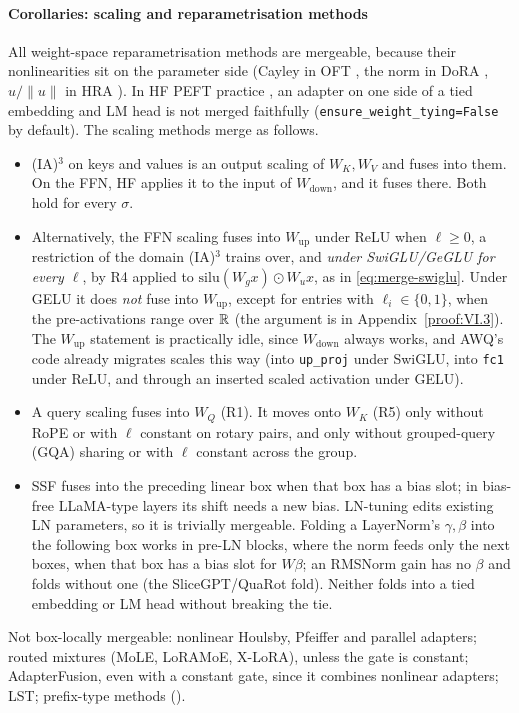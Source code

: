 \paragraph{Corollaries: scaling and reparametrisation methods}
All weight-space reparametrisation methods are mergeable, because their nonlinearities sit on the parameter side (Cayley
in OFT \citep{qiu2023controlling}, the norm in DoRA \citep{liu2024dora}, $u/\lVert u\rVert$ in HRA
\citep{yuan2024bridging}). In HF PEFT practice \citep{xmangrulkar2022peft}, an adapter on one side of a tied embedding
and LM head is not merged faithfully (\texttt{ensure\_weight\_tying=False} by default). The scaling methods merge as
follows.
\begin{itemize}
  \item (IA)$^3$ on keys and values is an output scaling of $W_K,W_V$ and fuses into them. On the FFN, HF applies it to
  the input of $W_{\mathrm{down}}$, and it fuses there. Both hold for every $\sigma$.
  \item Alternatively, the FFN scaling fuses into $W_{\mathrm{up}}$ under ReLU when $\ell\ge0$, a restriction of the
  domain (IA)$^3$ trains over, and \emph{under SwiGLU/GeGLU for every $\ell$}, by R4 applied to
  $\mathrm{silu}(W_gx)\odot W_ux$, as in \eqref{eq:merge-swiglu}. Under GELU it does \emph{not} fuse into
  $W_{\mathrm{up}}$, except for entries with $\ell_i\in\{0,1\}$, when the pre-activations range over $\mathbb{R}$ (the argument is
  in Appendix~\ref{proof:VI.3}). The $W_{\mathrm{up}}$ statement is practically idle, since $W_{\mathrm{down}}$ always
  works, and AWQ's code already migrates scales this way (into \texttt{up\_proj} under SwiGLU, into \texttt{fc1} under
  ReLU, and through an inserted scaled activation under GELU).
  \item A query scaling fuses into $W_Q$ (R1). It moves onto $W_K$ (R5) only without RoPE or with $\ell$ constant on
  rotary pairs, and only without grouped-query (GQA) sharing or with $\ell$ constant across the group.
  \item SSF fuses into the preceding linear box when that box has a bias slot; in bias-free LLaMA-type layers its shift
  needs a new bias. LN-tuning edits existing LN parameters, so it is trivially mergeable. Folding a LayerNorm's
  $\gamma,\beta$ into the following box works in pre-LN blocks, where the norm feeds only the next boxes, when that box
  has a bias slot for $W\beta$; an RMSNorm gain has no $\beta$ and folds without one (the SliceGPT/QuaRot fold). Neither
  folds into a tied embedding or LM head without breaking the tie.
\end{itemize}
Not box-locally mergeable: nonlinear Houlsby, Pfeiffer and parallel adapters; routed mixtures (MoLE, LoRAMoE, X-LoRA),
unless the gate is constant; AdapterFusion, even with a constant gate, since it combines nonlinear adapters; LST;
prefix-type methods ().

